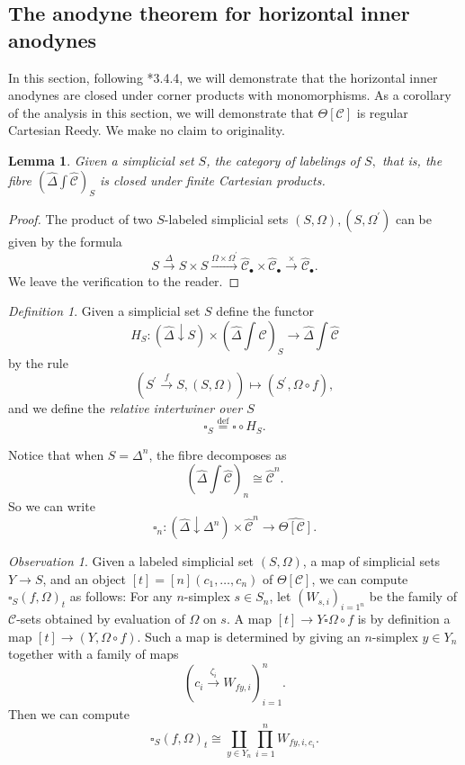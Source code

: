 \documentclass[leqno]{article}
\numberwithin{equation}{subsection}
\theoremstyle{plain}   %
\newtheorem{lemma}[equation]{Lemma}
\theoremstyle{remark}
\newtheorem{obs}[equation]{Observation}
\newtheorem{defn}[equation]{Definition}
\theoremstyle{plain}
\newcommand{\overcat}[2]{{\left(#1\downarrow #2\right)}}
\newcommand{\psh}[1]{\ensuremath{\widehat{#1}}}
\providecommand{\C}{}
\renewcommand{\C}{\ensuremath{\mathcal{C}}}
\newcommand{\defeq}{\overset{\mathrm{def}}=}
\newcommand{\cellset}{\ensuremath{\widehat{\Theta[\mathcal{C}]}}}
\newcommand{\ssetlab}{\ensuremath{\widehat{\Delta} \int \widehat{\mathcal{C}}}}
\begin{document}
\subsection{The anodyne theorem for horizontal inner anodynes}\label{horizontal}
In this section, following \cite{oury}*{3.4.4}, we will demonstrate that the horizontal inner anodynes are closed under corner products with monomorphisms.  As a corollary of the analysis in this section, we will demonstrate that \(\Theta[\C]\) is regular Cartesian Reedy.  We make no claim to originality.

\begin{lemma} Given a simplicial set \(S\), the category of labelings of \(S,\) that is, the fibre \(\left(\ssetlab\right)_S\) is closed under finite Cartesian products. 
\end{lemma}
\begin{proof} The product of two \(S\)-labeled simplicial sets \((S,\Omega), (S,\Omega^\prime)\) can be given by the formula 
	\[S\xrightarrow{\Delta} S\times S \xrightarrow{\Omega\times \Omega^\prime}  \psh{\C}_\bullet \times \psh{\C}_\bullet \xrightarrow{\times} \psh{\C}_\bullet.\]  We leave the verification to the reader.
\end{proof}

\begin{defn} Given a simplicial set \(S\) define the functor 
	\[H_S: \overcat{\psh{\Delta}}{S} \times  \left(\ssetlab\right)_S \to \ssetlab\]
	by the rule
	\[\left(S^\prime \xrightarrow{f} S, (S,\Omega)\right) \mapsto (S^\prime,  \Omega\circ f),\]
	and we define the \emph{relative intertwiner over \(S\)}
	\[\square_S \defeq \square \circ H_S.\]
	
	Notice that when \(S=\Delta^n\), the fibre decomposes as \[\left(\ssetlab\right)_n\cong \psh{\C}^n.\] So we can write 
	\[\square_n:\overcat{\psh{\Delta}}{\Delta^n} \times \psh{\C}^n \to \cellset.\]
\end{defn}

\begin{obs}\label{evaluationsquare}
	Given a labeled simplicial set \((S,\Omega)\), a map of simplicial sets \(Y\to S\), and an object \([t]=[n](c_1,\dots,c_n)\) of \(\Theta[\C]\), we can compute \(\square_S(f,\Omega)_t\) as follows: For any \(n\)-simplex \(s\in S_n\), let \((W_{s,i})_{i=1^n}\) be the family of \(\C\)-sets obtained by evaluation of \(\Omega\) on \(s\). A map \([t] \to Y\square \Omega\circ f\) is by definition a map \([t]\to (Y,\Omega\circ f)\).  Such a map is determined by giving an \(n\)-simplex \(y\in Y_n\) together with a family of maps 
	\[(c_i \xrightarrow{\zeta_i} W_{fy,i})_{i=1}^n.\] Then we can compute 
	\[\square_S(f,\Omega)_t\cong \coprod_{y\in Y_n} \prod_{i=1}^n W_{fy,i,c_i}.\]
\end{obs}
\end{document}

